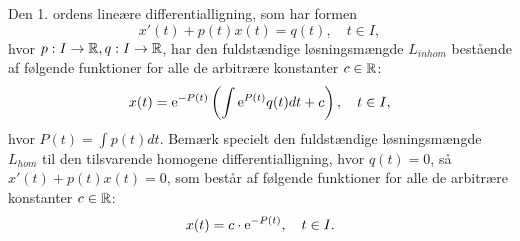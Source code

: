 \begin{theorem}[Panserformlen] \label{saet.panser1}
Den 1. ordens lineære differentialligning, som har formen
\begin{equation}
x'(t) + p(t)x(t) = q(t),\quad t \in I, \label{lig.saet.panser1} 
\end{equation}
hvor $ p : I \rightarrow \mathbb{R}, q : I \rightarrow \mathbb{R} $, har den fuldstændige løsningsmængde $ L_{inhom} $ bestående af følgende funktioner for alle de arbitrære konstanter $ c \in \mathbb{R} $:
\begin{equation}
x(t) = \mathrm{e} ^{-P(t)} \left( \int \mathrm{e} ^{P(t)}q(t)dt + c \right), \quad t \in I,
\end{equation}
hvor $ P(t)=\int p(t)dt $. \bs
Bemærk specielt den fuldstændige løsningsmængde $ L_{hom} $ til den tilsvarende homogene differentialligning, hvor $ q(t) = 0 $, så $ x'(t) + p(t)x(t) = 0 $, som består af følgende funktioner for alle de arbitrære konstanter $ c \in \mathbb{R} $:
\begin{equation}
x(t) = c\cdot \mathrm{e} ^{-P(t)}, \quad t \in I. \label{lig.saet.panser2} 
\end{equation}
\end{theorem}

